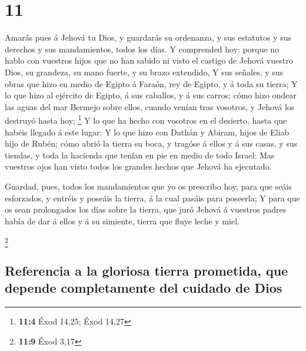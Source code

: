 \hypertarget{section-10}{%
\section{11}\label{section-10}}

 Amarás pues á Jehová tu Dios, y guardarás su ordenanza, y
sus estatutos y sus derechos y sus mandamientos, todos los días.
 Y comprended hoy: porque no hablo con vuestros hijos que no
han sabido ni visto el castigo de Jehová vuestro Dios, su grandeza, su
mano fuerte, y su brazo extendido,  Y sus señales, y sus
obras que hizo en medio de Egipto á Faraón, rey de Egipto, y á toda su
tierra;  Y lo que hizo al ejército de Egipto, á sus
caballos, y á sus carros; cómo hizo ondear las aguas del mar Bermejo
sobre ellos, cuando venían tras vosotros, y Jehová los destruyó hasta
hoy; \footnote{\textbf{11:4} Éxod 14,25; Éxod 14,27}  Y lo
que ha hecho con vosotros en el desierto, hasta que habéis llegado á
este lugar;  Y lo que hizo con Dathán y Abiram, hijos de
Eliab hijo de Rubén; cómo abrió la tierra su boca, y tragóse á ellos y á
sus casas, y sus tiendas, y toda la hacienda que tenían en pie en medio
de todo Israel:  Mas vuestros ojos han visto todos los
grandes hechos que Jehová ha ejecutado.

 Guardad, pues, todos los mandamientos que yo os prescribo
hoy, para que seáis esforzados, y entréis y poseáis la tierra, á la cual
pasáis para poseerla;  Y para que os sean prolongados los
días sobre la tierra, que juró Jehová á vuestros padres había de dar á
ellos y á su simiente, tierra que fluye leche y miel.

\footnote{\textbf{11:9} Éxod 3,17}

\hypertarget{referencia-a-la-gloriosa-tierra-prometida-que-depende-completamente-del-cuidado-de-dios}{%
\subsection{Referencia a la gloriosa tierra prometida, que depende
completamente del cuidado de
Dios}\label{referencia-a-la-gloriosa-tierra-prometida-que-depende-completamente-del-cuidado-de-dios}}

